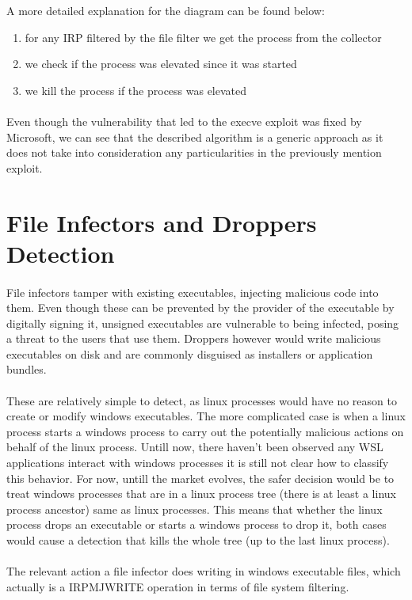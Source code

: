         
        A more detailed explanation for the diagram can be found below:

        \begin{enumerate}
            \item for any IRP filtered by the file filter we get the process from the collector
            \item we check if the process was elevated since it was started
            \item we kill the process if the process was elevated
        \end{enumerate}

        \paragraph{}
        Even though the vulnerability that led to the execve exploit\cite{execve} was fixed by Microsoft, we can see that the described algorithm
        is a generic approach as it does not take into consideration any particularities in the previously mention exploit.

    \section{File Infectors and Droppers Detection}
        \paragraph{}
        File infectors tamper with existing executables, injecting malicious code into them. Even though these can be prevented by the provider
        of the executable by digitally signing it, unsigned executables are vulnerable to being infected, posing a threat to the users that
        use them. Droppers however would write malicious executables on disk and are commonly disguised as installers or application bundles.

        \paragraph{}
        These are relatively simple to detect, as linux processes would have no reason to create or modify windows executables. The more
        complicated case is when a linux process starts a windows process to carry out the potentially malicious actions on behalf of the linux
        process. Untill now, there haven't been observed any WSL applications interact with windows processes it is still not clear how to
        classify this behavior. For now, untill the market evolves, the safer decision would be to treat windows processes that are in a
        linux process tree (there is at least a linux process ancestor) same as linux processes. This means that whether the linux process
        drops an executable or starts a windows process to drop it, both cases would cause a detection that kills the whole tree (up to the
        last linux process).

        \paragraph{}
        The relevant action a file infector does writing in windows executable files, which actually is a
        IRP\textunderscore MJ\textunderscore WRITE operation in terms of file system filtering.
